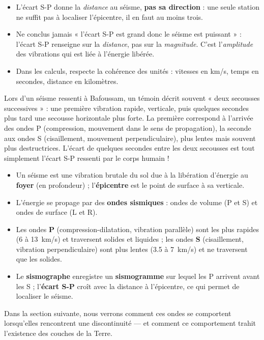 \documentclass[11pt]{article}
\begin{document}
\begin{attention}
\begin{itemize}
\item L'écart S-P donne la \emph{distance} au séisme, \textbf{pas sa direction} : une seule station ne suffit pas à localiser l'épicentre, il en faut au moins trois.
\item Ne conclus jamais « l'écart S-P est grand donc le séisme est puissant » : l'écart S-P renseigne sur la \emph{distance}, pas sur la \emph{magnitude}. C'est l'\emph{amplitude} des vibrations qui est liée à l'énergie libérée.
\item Dans les calculs, respecte la cohérence des unités : vitesses en km/s, temps en secondes, distance en kilomètres.
\end{itemize}
\end{attention}

\begin{exemplebox}
Lors d'un séisme ressenti à Bafoussam, un témoin décrit souvent « deux secousses successives » : une première vibration rapide, verticale, puis quelques secondes plus tard une secousse horizontale plus forte. La première correspond à l'arrivée des ondes P (compression, mouvement dans le sens de propagation), la seconde aux ondes S (cisaillement, mouvement perpendiculaire), plus lentes mais souvent plus destructrices. L'écart de quelques secondes entre les deux secousses est tout simplement l'écart S-P ressenti par le corps humain !
\end{exemplebox}

\begin{aretenir}
\begin{itemize}
\item Un séisme est une vibration brutale du sol due à la libération d'énergie au \textbf{foyer} (en profondeur) ; l'\textbf{épicentre} est le point de surface à sa verticale.
\item L'énergie se propage par des \textbf{ondes sismiques} : ondes de volume (P et S) et ondes de surface (L et R).
\item Les ondes \textbf{P} (compression-dilatation, vibration parallèle) sont les plus rapides (\SI{6}{} à \SI{13}{km/s}) et traversent solides et liquides ; les ondes \textbf{S} (cisaillement, vibration perpendiculaire) sont plus lentes (\SI{3,5}{} à \SI{7}{km/s}) et ne traversent que les solides.
\item Le \textbf{sismographe} enregistre un \textbf{sismogramme} sur lequel les P arrivent avant les S ; l'\textbf{écart S-P} croît avec la distance à l'épicentre, ce qui permet de localiser le séisme.
\end{itemize}
Dans la section suivante, nous verrons comment ces ondes se comportent lorsqu'elles rencontrent une discontinuité — et comment ce comportement trahit l'existence des couches de la Terre.
\end{aretenir}
\end{document}
